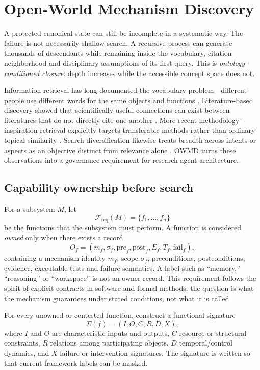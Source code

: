 \section{Open-World Mechanism Discovery}

A protected canonical state can still be incomplete in a systematic way. The failure is not necessarily shallow search. A recursive process can generate thousands of descendants while remaining inside the vocabulary, citation neighborhood and disciplinary assumptions of its first query. This is \emph{ontology-conditioned closure}: depth increases while the accessible concept space does not.

Information retrieval has long documented the vocabulary problem---different people use different words for the same objects and functions \cite{furnas1987}. Literature-based discovery showed that scientifically useful connections can exist between literatures that do not directly cite one another \cite{swanson1986}. More recent methodology-inspiration retrieval explicitly targets transferable methods rather than ordinary topical similarity \cite{garikaparthi2025}. Search diversification likewise treats breadth across intents or aspects as an objective distinct from relevance alone \cite{carbonell1998}. OWMD turns these observations into a governance requirement for research-agent architecture.

\subsection{Capability ownership before search}

For a subsystem \(M\), let
\[
\mathcal F_{\mathrm{req}}(M)=\{f_1,\ldots,f_n\}
\]
be the functions that the subsystem must perform. A function is considered \emph{owned} only when there exists a record
\[
O_f=(m_f,\sigma_f,\mathrm{pre}_f,\mathrm{post}_f,E_f,T_f,\mathrm{fail}_f),
\]
containing a mechanism identity \(m_f\), scope \(\sigma_f\), preconditions, postconditions, evidence, executable tests and failure semantics. A label such as ``memory,'' ``reasoning'' or ``workspace'' is not an owner record. This requirement follows the spirit of explicit contracts in software and formal methods: the question is what the mechanism guarantees under stated conditions, not what it is called.

For every unowned or contested function, construct a functional signature
\[
\Sigma(f)=(I,O,C,R,D,X),
\]
where \(I\) and \(O\) are characteristic inputs and outputs, \(C\) resource or structural constraints, \(R\) relations among participating objects, \(D\) temporal/control dynamics, and \(X\) failure or intervention signatures. The signature is written so that current framework labels can be masked.

